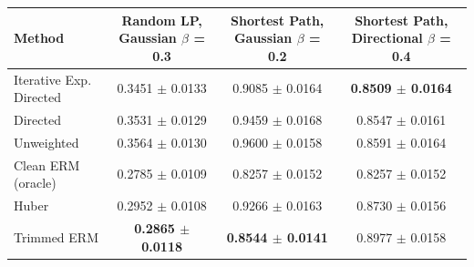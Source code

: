 \begin{tabular}{lccc}
\toprule
Method & Random LP, Gaussian $\beta$ = 0.3 & Shortest Path, Gaussian $\beta$ = 0.2 & Shortest Path, Directional $\beta$ = 0.4 \\
\midrule
Iterative Exp. Directed & 0.3451 $\pm$ 0.0133 & 0.9085 $\pm$ 0.0164 & \textbf{0.8509 $\pm$ 0.0164} \\
Directed & 0.3531 $\pm$ 0.0129 & 0.9459 $\pm$ 0.0168 & 0.8547 $\pm$ 0.0161 \\
Unweighted & 0.3564 $\pm$ 0.0130 & 0.9600 $\pm$ 0.0158 & 0.8591 $\pm$ 0.0164 \\
Clean ERM (oracle) & 0.2785 $\pm$ 0.0109 & 0.8257 $\pm$ 0.0152 & 0.8257 $\pm$ 0.0152 \\
Huber & 0.2952 $\pm$ 0.0108 & 0.9266 $\pm$ 0.0163 & 0.8730 $\pm$ 0.0156 \\
Trimmed ERM & \textbf{0.2865 $\pm$ 0.0118} & \textbf{0.8544 $\pm$ 0.0141} & 0.8977 $\pm$ 0.0158 \\
\bottomrule
\end{tabular}
